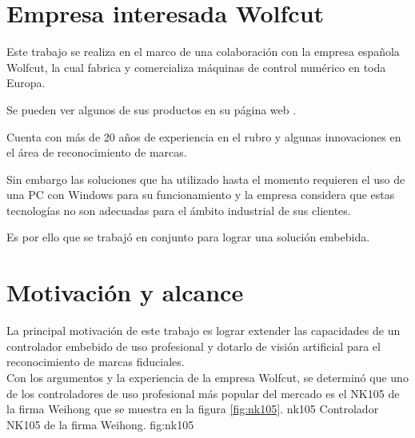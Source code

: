\section{Empresa interesada Wolfcut}
\label{section:empresa_interesada}

Este trabajo se realiza en el marco de una colaboración con la empresa española Wolfcut, la cual fabrica y comercializa máquinas de control numérico en toda Europa.\par
Se pueden ver algunos de sus productos en su página web \wolfcutlink.\par
Cuenta con más de 20 años de experiencia en el rubro y algunas innovaciones en el área de reconocimiento de marcas.\par
Sin embargo las soluciones que ha utilizado hasta el momento requieren el uso de una PC con Windows para su funcionamiento y la empresa considera que estas tecnologías no son adecuadas para el ámbito industrial de sus clientes.\par
Es por ello que se trabajó en conjunto para lograr una solución embebida.\par

\section{Motivación y alcance}
   La principal motivación de este trabajo es lograr extender las capacidades de un controlador embebido de uso profesional y dotarlo de visión artificial para el reconocimiento de marcas fiduciales. \\
   Con los argumentos y la experiencia de la empresa Wolfcut, se determinó que uno de los controladores de uso profesional más popular del mercado es el NK105 de la firma Weihong \citep{WEBSITE:nk105} que se muestra en la figura \ref{fig:nk105}.
      {nk105}
      {Controlador NK105 de la firma Weihong.}
      {fig:nk105}

